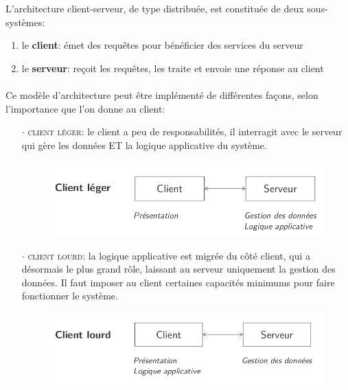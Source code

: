 \item{}
{L'architecture client-serveur, de type distribuée, est constituée de deux sous-systèmes:
\begin{enumerate}
\item le \textbf{client}: émet des requêtes pour bénéficier des services du serveur
\item le \textbf{serveur}: reçoit les requêtes, les traite et envoie une réponse au client
\end{enumerate}

\paragraph{}
Ce modèle d'architecture peut être implémenté de différentes façons, selon l'importance que l'on donne au client:
\begin{itemize}
\item[$\cdot$] \textcolor{ltred}{\textsc{client léger}}: le client a peu de responsabilités, il interragit avec le serveur qui gère les données ET la logique applicative du système.
	\begin{figure}[h!]
	\center\includegraphics[scale=.3]{images/client-leger}
	\end{figure}
\item[$\cdot$] \textcolor{ltred}{\textsc{client lourd}}: la logique applicative est migrée du côté client, qui a désormais le plus grand rôle, laissant au serveur uniquement la gestion des données. Il faut imposer au client certaines capacités minimums pour faire fonctionner le système.
	\begin{figure}[h!]
	\center\includegraphics[scale=.3]{images/client-lourd}
	\end{figure}
\end{itemize}
}

\item{}
{}